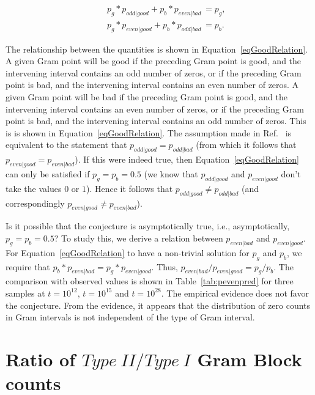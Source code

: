 \documentclass[twoside]{article}
\begin{document}
\begin{eqnarray}
&&p_g*p_{odd|good}  + p_b*p_{even|bad}\, =  p_g,\nonumber\\
&&p_g*p_{even|good} + p_b*p_{odd|bad}\, = p_b.
\label{eqGoodRelation}
\end{eqnarray}

The relationship between the quantities is shown in Equation~\ref{eqGoodRelation}. A given Gram point will be good if the preceding Gram point is good, and the intervening interval contains an odd number of zeros, or if the preceding Gram point is bad, and the intervening interval contains an even number of zeros. A given Gram point will be bad if the preceding Gram point is good, and the intervening interval contains an even number of zeros, or if the preceding Gram point is bad, and the intervening interval contains an odd number of zeros. This is is shown in Equation~\ref{eqGoodRelation}. The assumption made in Ref.~\cite{Odlyzko 1992} is equivalent to the statement that $p_{odd|good} = p_{odd|bad}$ (from which it follows that  $p_{even|good} = p_{even|bad}$). If this were indeed true, then Equation~\ref{eqGoodRelation} can only be satisfied if $p_g = p_b = 0.5$ (we know that $p_{odd|good}$ and $p_{even|good}$ don't take the values $0$ or $1$). Hence it follows that $p_{odd|good} \neq p_{odd|bad}$ (and correspondingly $p_{even|good} \neq p_{even|bad}$). 

Is it possible that the conjecture is asymptotically true, i.e., asymptotically, $p_g = p_b = 0.5$? To study this, we derive a relation between $p_{even|bad}$ and $p_{even|good}$. For Equation~\ref{eqGoodRelation} to have a non-trivial solution for $p_g$ and $p_b$, we require that $p_b*p_{even|bad} = p_g*p_{even|good}$. Thus, $p_{even|bad}/p_{even|good}= p_g/p_b$. The comparison with observed values is shown in Table~\ref{tab:pevenpred} for three samples at $t=10^{12}$, $t=10^{15}$  and $t=10^{28}$. The empirical evidence does not favor the conjecture. From the evidence, it appears that the distribution of zero counts in Gram intervals is not independent of the type of Gram interval. 

\section{\label{sec6}Ratio of $Type~II/Type~I$ Gram Block counts}
\end{document}
